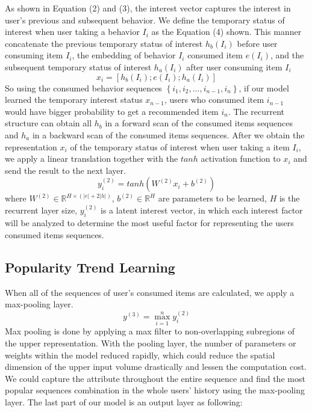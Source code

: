 \documentclass[runningheads]{llncs}
\begin{document}
As shown in Equation (2) and (3), the interest vector captures the interest in user's previous and subsequent behavior. We define the temporary status of interest when user taking a behavior $I_{i}$ as the Equation (4) shown. This manner concatenate the previous temporary status of interest $h_{b}(I_{i})$ before user consuming item $I_{i}$, the embedding of behavior $I_{i}$ consumed item $e(I_{i})$, and the subsequent temporary status of interest $h_{a}(I_{i})$ after user consuming item $I_{i}$
\begin{equation}
x_{i}=[h_{b}(I_{i});e(I_{i});h_{a}(I_{i})]
\end{equation}
So using the consumed behavior sequences $\left \{ i_{1},i_{2},...,i_{n-1},i_{n} \right \}$, if our model learned the temporary interest status $x_{n-1}$, users who consumed item $i_{n-1}$ would have bigger probability to get a recommended item $i_{n}$. The recurrent structure can obtain all $h_{b}$ in a forward scan of the consumed items sequences and $h_{a}$ in a backward scan of the consumed items sequences. After we obtain the representation $x_{i}$ of the temporary status of interest when user taking a item $I_{i}$, we apply a linear translation together with the $tanh$ activation function to $x_{i}$ and send the result to the next layer.
\begin{equation}
y_{i}^{(2)}=tanh(W^{(2)}x_{i}+b^{(2)})
\end{equation}
where $W^{(2)}\in \mathbb{R}^{H\times (|e|+2|h|)}$, $b^{(2)}\in \mathbb{R}^{H}$ are parameters to be learned, $H$ is the recurrent layer size, $y_{i}^{(2)}$ is a latent interest vector, in which each interest factor will be analyzed to determine the most useful factor for representing the users consumed items sequences.

\subsection{Popularity Trend Learning}
When all of the sequences of user's consumed items are calculated, we apply a max-pooling layer.
\begin{equation}
y^{(3)}=\max_{i=1}^{n}y_{i}^{(2)}
\end{equation}
Max pooling is done by applying a max filter to non-overlapping subregions of the upper representation. With the pooling layer, the number of parameters or weights within the model reduced rapidly, which could reduce the spatial dimension of the upper input volume drastically and lessen the computation cost. We could capture the attribute throughout the entire sequence and find the most popular sequences combination in the whole users' history using the max-pooling layer. The last part of our model is an output layer as following:
\end{document}
